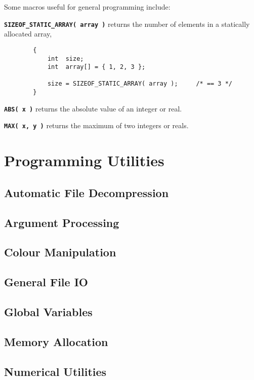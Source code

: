 \newcommand{\definemacro}[2]{
\noindent
{\bf\tt #1}
#2}

Some macros useful for general programming include:
\break

\definemacro{SIZEOF\_STATIC\_ARRAY( array )}
{returns the number of elements in a statically allocated array},
\begin{verbatim}
        {
            int  size;
            int  array[] = { 1, 2, 3 };

            size = SIZEOF_STATIC_ARRAY( array );     /* == 3 */
        }
\end{verbatim}

\definemacro{ABS( x )}{returns the absolute value of an integer or real}.

\definemacro{MAX( x, y )}{returns the maximum of two integers or reals}.

\section{Programming Utilities}

\subsection{Automatic File Decompression}

\subsection{Argument Processing}

\subsection{Colour Manipulation}

\subsection{General File IO}

\subsection{Global Variables}

\subsection{Memory Allocation}

\subsection{Numerical Utilities}

